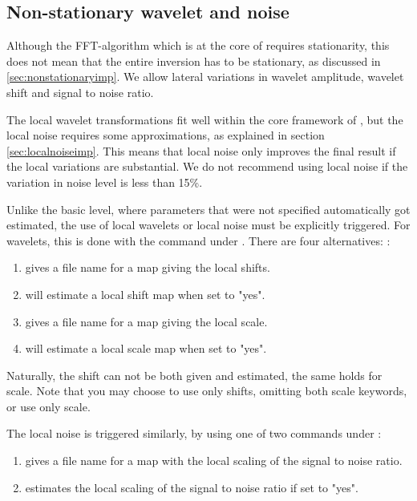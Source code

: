 \subsection{Non-stationary wavelet and noise}
Although the FFT-algorithm which is at the core of \crava requires
stationarity, this does not mean that the entire inversion has to be
stationary, as discussed in \autoref{sec:nonstationaryimp}. We allow
lateral variations in wavelet amplitude, wavelet shift and signal to
noise ratio.

The local wavelet transformations fit well within the core framework
of \crava, but the local noise requires some approximations, as
explained in section \autoref{sec:localnoiseimp}. This means that
local noise only improves the final result if the local variations are
substantial. We do not recommend using local noise if the variation in
noise level is less than 15\%.

Unlike the basic level, where parameters that were not specified 
automatically got estimated, the use of local wavelets or local noise
must be explicitly triggered. For wavelets, this is done with the
 command under
. There are four alternatives:
: 
\begin{enumerate}
\item {} gives a file name for a map giving the local shifts. 
\item {} will estimate a local shift map when set to "yes".
\item {} gives a file name for a map giving the local scale. 
\item {} will estimate a local scale map when set to "yes".
\end{enumerate}
Naturally, the shift can not be both given and estimated, the same
holds for scale. Note that you may choose to use only shifts, omitting
both scale keywords, or use only scale. 

The local noise is triggered similarly, by using one of two
commands under : 
\begin{enumerate}
\item {} gives a file name for a map with the local scaling of
  the signal to noise ratio.
\item {} estimates the local scaling of the
  signal to noise ratio if set to "yes". 
\end{enumerate}

